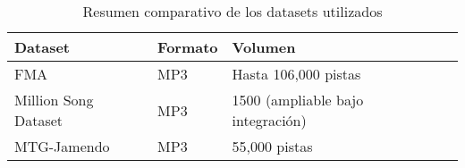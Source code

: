 \begin{table}[h]
\caption{Resumen comparativo de los datasets utilizados}
\centering
\begin{tabular}{|l|l|l|l|}
\hline
\textbf{Dataset} & \textbf{Formato} & \textbf{Volumen} \\ \hline
FMA & MP3 & Hasta 106,000 pistas \\ \hline
Million Song Dataset & MP3 & 1500 (ampliable bajo integración)  \\ \hline
MTG-Jamendo & MP3 & 55,000 pistas \\ \hline
\end{tabular}
\end{table}